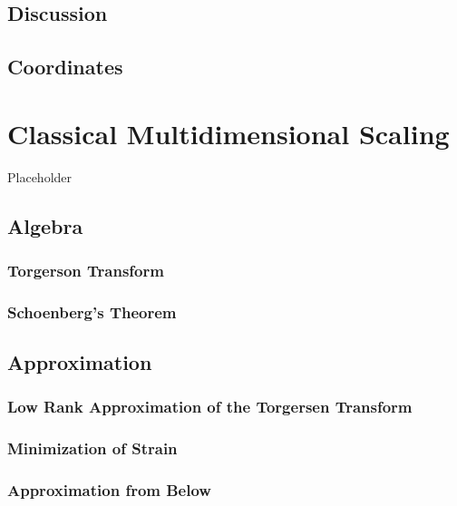 \documentclass[
  12pt,
]{book}
\begin{document}
\section{Discussion}\label{discussion}

\section{Coordinates}\label{coordinates}

\chapter{Classical Multidimensional Scaling}\label{classical-multidimensional-scaling}

Placeholder

\section{Algebra}\label{algebra}

\subsection{Torgerson Transform}\label{torgerson-transform}

\subsection{Schoenberg's Theorem}\label{schoenbergs-theorem}

\section{Approximation}\label{approximation}

\subsection{Low Rank Approximation of the Torgersen Transform}\label{low-rank-approximation-of-the-torgersen-transform}

\subsection{Minimization of Strain}\label{minimization-of-strain}

\subsection{Approximation from Below}\label{approximation-from-below}
\end{document}
